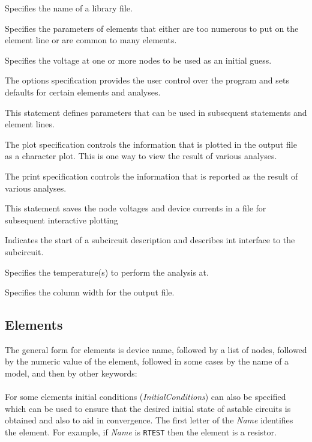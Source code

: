 Specifies the name of a library file.

Specifies the parameters of elements that either are
too numerous to put on the element line or are common to many elements.

Specifies the voltage at one or more nodes to be used as an initial guess.

The options specification provides the user control over the program
and sets defaults for certain elements and analyses.

This statement defines parameters that can be used in subsequent statements
and element lines.

The plot specification controls the information that is plotted in
the output file as a character plot. This is one way to view the result
of various analyses.

The print specification controls the information that is reported as the result
of various analyses.

This statement saves the node voltages and device currents in a
file for subsequent interactive plotting

Indicates the start of a subcircuit description and describes int interface
to the subcircuit.

Specifies the temperature(s) to perform the analysis at.

{}

{}

Specifies the column width for the output file.

\subsection{Elements}

The general form for elements is device name, followed by
a list of nodes, followed by the numeric value of the element,
followed in some cases by the name of a model, and then by other keywords:\\
\hspace*{\fill}\\
For some elements
initial conditions ({\it InitialConditions}) can also be specified
which can be used to ensure that the desired initial state of astable circuits
is obtained and also to aid in convergence. The first letter of the
{\it Name} identifies the element.  For example, if {\it Name} is
{\tt RTEST} then the element is a resistor.

